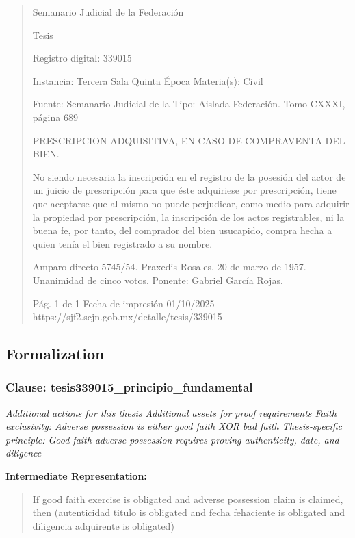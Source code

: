 \documentclass[11pt,a4paper]{article}
\begin{document}
\begin{quote}
                                                   Semanario Judicial de la Federación

                                                  Tesis

 Registro digital: 339015

 Instancia: Tercera Sala          Quinta Época                           Materia(s): Civil

                                  Fuente: Semanario Judicial de la       Tipo: Aislada
                                  Federación.
                                  Tomo CXXXI, página 689


PRESCRIPCION ADQUISITIVA, EN CASO DE COMPRAVENTA DEL BIEN.


No siendo necesaria la inscripción en el registro de la posesión del actor de un juicio de prescripción
para que éste adquiriese por prescripción, tiene que aceptarse que al mismo no puede perjudicar,
como medio para adquirir la propiedad por prescripción, la inscripción de los actos registrables, ni la
buena fe, por tanto, del comprador del bien usucapido, compra hecha a quien tenía el bien
registrado a su nombre.


Amparo directo 5745/54. Praxedis Rosales. 20 de marzo de 1957. Unanimidad de cinco votos.
Ponente: Gabriel García Rojas.




                                             Pág. 1 de 1              Fecha de impresión 01/10/2025
  https://sjf2.scjn.gob.mx/detalle/tesis/339015

\end{quote}

\subsection{Formalization}

\subsubsection{Clause: tesis339015\_principio\_fundamental}

\textit{Additional actions for this thesis Additional assets for proof requirements Faith exclusivity: Adverse possession is either good faith XOR bad faith Thesis-specific principle: Good faith adverse possession requires proving authenticity, date, and diligence}

\textbf{Intermediate Representation:}

\begin{quote}
If good faith exercise is obligated and adverse possession claim is claimed, then (autenticidad titulo is obligated and fecha fehaciente is obligated and diligencia adquirente is obligated)
\end{quote}
\end{document}
